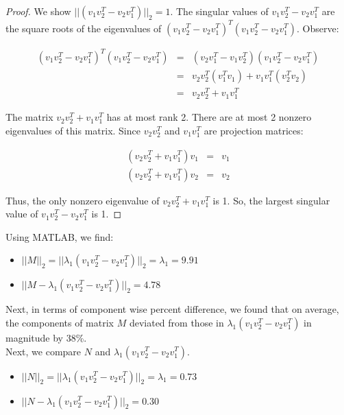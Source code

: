 \documentclass[a4,11pt,twoside,leqno]{report}
\theoremstyle{definition}
\theoremstyle{remark}
\numberwithin{equation}{section}
\begin{document}
\begin{proof}
We show $||(v_1v_2^T-v_2v_1^T)||_2=1$. The singular values of $v_1v_2^T-v_2v_1^T$ are the square roots of the eigenvalues of $(v_1v_2^T-v_2v_1^T)^T(v_1v_2^T-v_2v_1^T)$. Observe:

$$\begin{array}{lcl}
(v_1v_2^T-v_2v_1^T)^T(v_1v_2^T-v_2v_1^T) &=& (v_2v_1^T-v_1v_2^T)(v_1v_2^T-v_2v_1^T) \\ &=& v_2v_2^T(v_1^Tv_1)+v_1v_1^T(v_2^Tv_2) \\ &=& v_2v_2^T+v_1v_1^T
\end{array}$$

The matrix $v_2v_2^T+v_1v_1^T$ has at most rank 2. There are at most 2 nonzero eigenvalues of this matrix. Since $v_2v_2^T$ and $v_1v_1^T$ are projection matrices:

$$\begin{array}{lcl}
(v_2v_2^T+v_1v_1^T)v_1 &=& v_1 \\ (v_2v_2^T+v_1v_1^T)v_2 &=& v_2
\end{array}$$

Thus, the only nonzero eigenvalue of $v_2v_2^T+v_1v_1^T$ is 1. So, the largest singular value of $v_1v_2^T-v_2v_1^T$ is 1.
\end{proof}

Using MATLAB, we find:

\begin{itemize}

\item $||M||_2=||\lambda_1(v_1v_2^T-v_2v_1^T)||_2=\lambda_1=9.91$
\item $||M-\lambda_1(v_1v_2^T-v_2v_1^T)||_2=4.78$

\end{itemize}

Next, in terms of component wise percent difference, we found that on average, the components of matrix $M$ deviated from those in $\lambda_1(v_1v_2^T-v_2v_1^T)$ in magnitude by 38\%. \\

Next, we compare $N$ and $\lambda_1(v_1v_2^T-v_2v_1^T)$.

\begin{itemize}

\item $||N||_2=||\lambda_1(v_1v_2^T-v_2v_1^T)||_2=\lambda_1=0.73$
\item $||N-\lambda_1(v_1v_2^T-v_2v_1^T)||_2=0.30$

\end{itemize}
 
\end{document}
